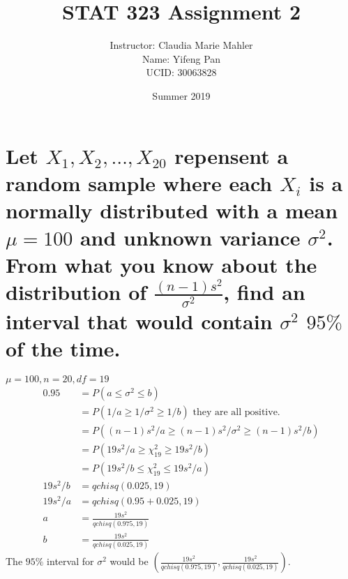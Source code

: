 \documentclass[10pt, letterpaper, titlepage]{article}
\title{STAT 323 Assignment 2}
\author{Instructor: Claudia Marie Mahler
    \\Name: Yifeng Pan
    \\UCID: 30063828}
\date{Summer 2019}
\begin{document}
    \maketitle
    \section{Let $X_1 , X_2 , \hdots , X_{20}$ repensent a random sample where each $X_i$ is a normally distributed with
        a mean $\mu = 100$ and unknown variance $\sigma^2$. From what you know about the distribution 
        of $\frac{(n - 1) s^2}{\sigma^2}$, find an interval that would contain $\sigma^2$ $95\%$ of the time.}
        $\mu = 100, n = 20, df = 19$
        \begin{align*}
            0.95 &= P(a \leq \sigma^2 \leq b)\\
            &= P(1/a \geq 1/\sigma^2 \geq 1/b) \text{ they are all positive.}\\
            &= P((n - 1)s^2/a \geq (n - 1)s^2/\sigma^2 \geq (n - 1)s^2/b)\\
            &= P(19s^2/a \geq \chi^2_{19} \geq 19s^2/b) \\
            &= P(19s^2/b \leq \chi^2_{19} \leq 19s^2/a)\\
            19s^2/b &= qchisq(0.025, 19)\\
            19s^2/a &= qchisq(0.95+0.025, 19) \\
            a &= \frac{19s^2}{qchisq(0.975, 19)} \\
            b &= \frac{19s^2}{qchisq(0.025, 19)}
        \end{align*}
        The $95\%$ interval for $\sigma^2$ would be $(\frac{19s^2}{qchisq(0.975, 19)},\frac{19s^2}{qchisq(0.025, 19)})$.
\end{document}
